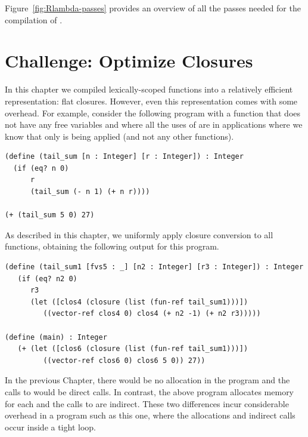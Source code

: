 \documentclass[7x10]{TimesAPriori_MIT}%
\begin{document}
Figure~\ref{fig:Rlambda-passes} provides an overview of all the passes needed
for the compilation of \LangLam{}.

\clearpage

\section{Challenge: Optimize Closures}
\label{sec:optimize-closures}

In this chapter we compiled lexically-scoped functions into a
relatively efficient representation: flat closures. However, even this
representation comes with some overhead. For example, consider the
following program with a function  that does not have
any free variables and where all the uses of  are in
applications where we know that only  is being applied
(and not any other functions).
\begin{center}
\begin{minipage}{0.95\textwidth}
\begin{lstlisting}
(define (tail_sum [n : Integer] [r : Integer]) : Integer
  (if (eq? n 0)
      r
      (tail_sum (- n 1) (+ n r))))

(+ (tail_sum 5 0) 27)
\end{lstlisting}
\end{minipage}
\end{center}
As described in this chapter, we uniformly apply closure conversion to
all functions, obtaining the following output for this program.
\begin{center}
\begin{minipage}{0.95\textwidth}
\begin{lstlisting}
(define (tail_sum1 [fvs5 : _] [n2 : Integer] [r3 : Integer]) : Integer
   (if (eq? n2 0)
      r3
      (let ([clos4 (closure (list (fun-ref tail_sum1)))])
         ((vector-ref clos4 0) clos4 (+ n2 -1) (+ n2 r3)))))

(define (main) : Integer
   (+ (let ([clos6 (closure (list (fun-ref tail_sum1)))])
         ((vector-ref clos6 0) clos6 5 0)) 27))
\end{lstlisting}
\end{minipage}
\end{center}

In the previous Chapter, there would be no allocation in the program
and the calls to  would be direct calls. In contrast,
the above program allocates memory for each  and the
calls to  are indirect. These two differences incur
considerable overhead in a program such as this one, where the
allocations and indirect calls occur inside a tight loop.
\end{document}

